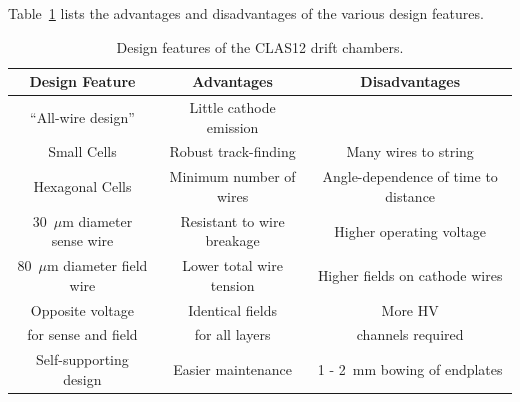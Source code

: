 Table~\ref{fwd-dc-design-features} lists the advantages and disadvantages
of the various design features.
\begin{table}[ht]
 \begin{center}
  \begin{tabular} {||c|c|c||} \hline \hline
 {\bf Design Feature  }       &{\bf Advantages} &{\bf Disadvantages}\\ \hline
``All-wire design'' & Little cathode emission & \\ \hline
Small Cells & Robust track-finding  & Many wires to string \\ \hline
Hexagonal Cells & Minimum number of wires  & Angle-dependence of time to distance  \\ \hline
30~$\mu$m diameter sense wire & Resistant to wire breakage & Higher operating voltage \\ \hline
80~$\mu$m diameter field wire & Lower total wire tension & Higher fields on cathode wires \\ \hline
Opposite voltage  & Identical fields & More HV \\
for sense and field & for all layers & channels required \\ \hline
Self-supporting design & Easier maintenance & 1 - 2~mm bowing of endplates \\ \hline
\end{tabular}
\caption{\small{Design features of the CLAS12 drift chambers.}}
\label{fwd-dc-design-features}
\end{center}
\end{table}



